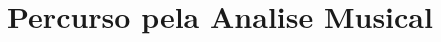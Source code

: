 \documentclass[
	12pt,				%
	openright,			%
	twoside,			%
	a4paper,			%
	english,			%
	french,				%
	spanish,			%
	brazil				%
	]{abntex2}
\begin{document}

\tableofcontents*
\cleardoublepage

%
%
%
%
%
%
%
\textual








\part{Percurso pela Analise Musical }








\end{document}
